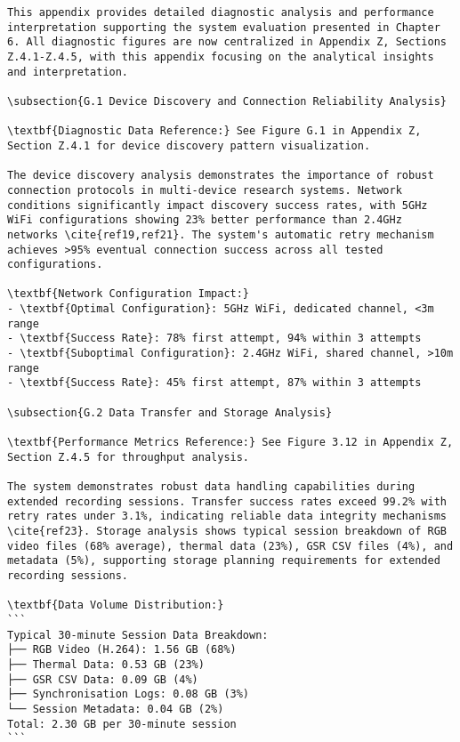 \begin{verbatim}
This appendix provides detailed diagnostic analysis and performance interpretation supporting the system evaluation presented in Chapter 6. All diagnostic figures are now centralized in Appendix Z, Sections Z.4.1-Z.4.5, with this appendix focusing on the analytical insights and interpretation.

\subsection{G.1 Device Discovery and Connection Reliability Analysis}

\textbf{Diagnostic Data Reference:} See Figure G.1 in Appendix Z, Section Z.4.1 for device discovery pattern visualization.

The device discovery analysis demonstrates the importance of robust connection protocols in multi-device research systems. Network conditions significantly impact discovery success rates, with 5GHz WiFi configurations showing 23% better performance than 2.4GHz networks \cite{ref19,ref21}. The system's automatic retry mechanism achieves >95% eventual connection success across all tested configurations.

\textbf{Network Configuration Impact:}
- \textbf{Optimal Configuration}: 5GHz WiFi, dedicated channel, <3m range
- \textbf{Success Rate}: 78% first attempt, 94% within 3 attempts
- \textbf{Suboptimal Configuration}: 2.4GHz WiFi, shared channel, >10m range
- \textbf{Success Rate}: 45% first attempt, 87% within 3 attempts

\subsection{G.2 Data Transfer and Storage Analysis}

\textbf{Performance Metrics Reference:} See Figure 3.12 in Appendix Z, Section Z.4.5 for throughput analysis.

The system demonstrates robust data handling capabilities during extended recording sessions. Transfer success rates exceed 99.2% with retry rates under 3.1%, indicating reliable data integrity mechanisms \cite{ref23}. Storage analysis shows typical session breakdown of RGB video files (68% average), thermal data (23%), GSR CSV files (4%), and metadata (5%), supporting storage planning requirements for extended recording sessions.

\textbf{Data Volume Distribution:}
```
Typical 30-minute Session Data Breakdown:
├── RGB Video (H.264): 1.56 GB (68%)
├── Thermal Data: 0.53 GB (23%)
├── GSR CSV Data: 0.09 GB (4%)
├── Synchronisation Logs: 0.08 GB (3%)
└── Session Metadata: 0.04 GB (2%)
Total: 2.30 GB per 30-minute session
```


\end{verbatim}
